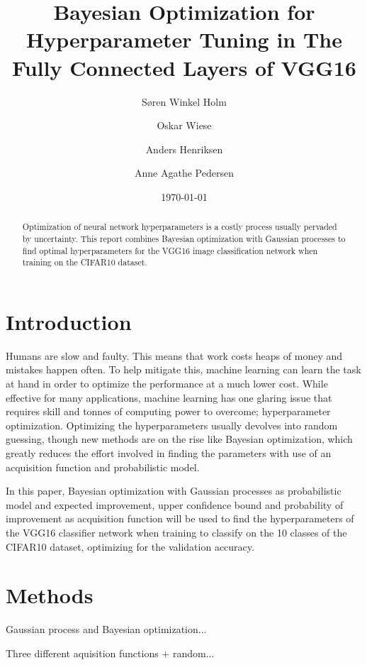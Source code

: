 \documentclass[12pt,fleqn]{article}
\title{Bayesian Optimization for Hyperparameter Tuning in The Fully Connected Layers of VGG16}
\author{Søren Winkel Holm\and Oskar Wiese\and Anders Henriksen\and Anne Agathe Pedersen}
\date{\today}
\begin{document}
\maketitle


\begin{abstract}

Optimization of neural network hyperparameters is a costly process usually pervaded by uncertainty. 
This report combines Bayesian optimization with Gaussian processes to find optimal hyperparameters for the VGG16 image classification network when training on the CIFAR10 dataset. 

\end{abstract}


\section{Introduction} 
Humans are slow and faulty. This means that work costs heaps of money and mistakes happen often. To help mitigate this, machine learning can learn the task at hand in order to optimize the performance at a much lower cost. While effective for many applications, machine learning has one glaring issue that requires skill and tonnes of computing power to overcome; hyperparameter optimization. Optimizing the hyperparameters usually devolves into random guessing, though new methods are on the rise like Bayesian optimization, which greatly reduces the effort involved in finding the parameters with use of an acquisition function and probabilistic model.

In this paper, Bayesian optimization with Gaussian processes as probabilistic model and expected improvement, upper confidence bound and probability of improvement as acquisition function will be used to find the hyperparameters of the VGG16 classifier network when training to classify on the 10 classes of the CIFAR10 dataset, optimizing for the validation accuracy.


\section{Methods}
Gaussian process and Bayesian optimization...

Three different aquisition functions + random...
\end{document}
